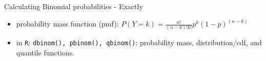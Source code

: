 \documentclass[10pt]{beamer}\usepackage[]{graphicx}\usepackage[]{color}
\begin{document}

\begin{frame}{Calculating Binomial probabilities - Exactly}
	
	
	
	\begin{itemize}
		\item  probability mass function (pmf): $P(Y=k) =
		\frac{n!}{(n-k)!k!}p^k(1-p)^{(n-k)}$
		\item in \texttt{R}: \texttt{dbinom(), pbinom(), qbinom()}: \newline probability mass, distribution/cdf, and quantile functions.
	\end{itemize}
	
\end{frame}
\end{document}
